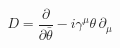 \begin{equation}
D = \frac{\partial}{\partial\bar\theta} - i\gamma^\mu\theta\,\partial_\mu
\end{equation}


